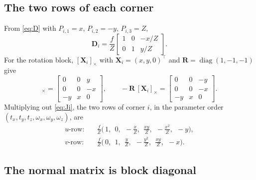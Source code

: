 \documentclass[11pt,a4paper]{article}
\theoremstyle{remark}
\newcommand{\Rmat}{\mathbf{R}}
\newcommand{\Dmat}{\mathbf{D}}
\newcommand{\Xvec}{\mathbf{X}}
\newcommand{\skewm}[1]{[#1]_{\times}}
\begin{document}
\subsection{The two rows of each corner}

From \eqref{eq:D} with $P_{i,1} = x$, $P_{i,2} = -y$, $P_{i,3} = Z$,
\begin{equation}
  \Dmat_i = \frac{f}{Z}
  \begin{bmatrix} 1 & 0 & -x/Z \\ 0 & 1 & y/Z \end{bmatrix}.
\end{equation}
For the rotation block, $\skewm{\Xvec_i}$ with $\Xvec_i = (x,y,0)^{\top}$ and
$\Rmat = \operatorname{diag}(1,-1,-1)$ give
\begin{equation}
  \skewm{\Xvec_i} =
  \begin{bmatrix} 0 & 0 & y \\ 0 & 0 & -x \\ -y & x & 0 \end{bmatrix},
  \qquad
  -\Rmat\,\skewm{\Xvec_i} =
  \begin{bmatrix} 0 & 0 & -y \\ 0 & 0 & -x \\ -y & x & 0 \end{bmatrix}.
\end{equation}
Multiplying out \eqref{eq:Ji}, the two rows of corner $i$, in the parameter
order $(t_x,t_y,t_z,\omega_x,\omega_y,\omega_z)$, are
\begin{align}
  \text{$u$-row:}\quad
  &\frac{f}{Z}\Big(\,1,\ \ 0,\ \ -\frac{x}{Z},\ \ \frac{xy}{Z},\ \
     -\frac{x^2}{Z},\ \ -y\Big), \label{eq:urow}\\
  \text{$v$-row:}\quad
  &\frac{f}{Z}\Big(\,0,\ \ 1,\ \ \frac{y}{Z},\ \ -\frac{y^2}{Z},\ \
     \frac{xy}{Z},\ \ -x\Big). \label{eq:vrow}
\end{align}

\subsection{The normal matrix is block diagonal}
\end{document}
